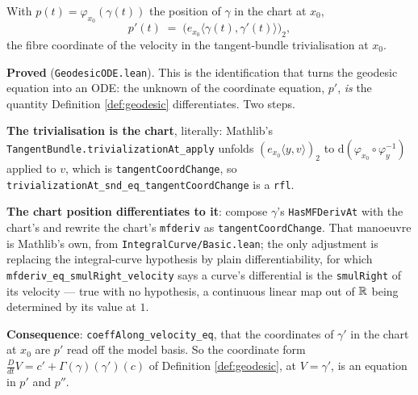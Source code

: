 \begin{lemma}
  \label{lem:geodesic-chart}
  \leanok
  With $p(t) = \varphi_{x_0}(\gamma(t))$ the position of $\gamma$ in the chart at $x_0$,
  \[
    p'(t) \;=\; \bigl(e_{x_0}\langle \gamma(t), \gamma'(t)\rangle\bigr)_2 ,
  \]
  the fibre coordinate of the velocity in the tangent-bundle trivialisation at $x_0$.

  \textbf{Proved} (\texttt{GeodesicODE.lean}). This is the identification that turns the
  geodesic equation into an ODE: the unknown of the coordinate equation, $p'$, \emph{is} the
  quantity Definition \ref{def:geodesic} differentiates. Two steps.

  \textbf{The trivialisation is the chart}, literally: Mathlib's
  \texttt{TangentBundle.trivializationAt\_apply} unfolds
  $(e_{x_0}\langle y,v\rangle)_2$ to $\mathrm{d}(\varphi_{x_0}\circ\varphi_y^{-1})$ applied to
  $v$, which is \texttt{tangentCoordChange}, so
  \texttt{trivializationAt\_snd\_eq\_tangentCoordChange} is a \texttt{rfl}.

  \textbf{The chart position differentiates to it}: compose $\gamma$'s
  \texttt{HasMFDerivAt} with the chart's and rewrite the chart's \texttt{mfderiv} as
  \texttt{tangentCoordChange}. That manoeuvre is Mathlib's own, from
  \texttt{IntegralCurve/Basic.lean}; the only adjustment is replacing the integral-curve
  hypothesis by plain differentiability, for which
  \texttt{mfderiv\_eq\_smulRight\_velocity} says a curve's differential is the
  \texttt{smulRight} of its velocity --- true with no hypothesis, a continuous linear map out
  of $\mathbb{R}$ being determined by its value at $1$.

  \textbf{Consequence}: \texttt{coeffAlong\_velocity\_eq}, that the coordinates of $\gamma'$ in
  the chart at $x_0$ are $p'$ read off the model basis. So the coordinate form
  $\frac{D}{dt}V = c' + \Gamma(\gamma)(\gamma')(c)$ of Definition \ref{def:geodesic}, at
  $V = \gamma'$, is an equation in $p'$ and $p''$.


\end{lemma}
